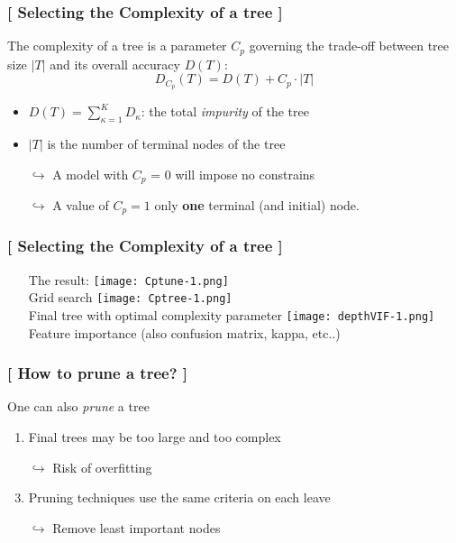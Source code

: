 \documentclass[xcolor=x11names,compress]{beamer}
\renewcommand{\(}{\begin{columns}}
\renewcommand{\)}{\end{columns}}
\newcommand{\<}[1]{\begin{column}{#1}}
\renewcommand{\>}{\end{column}}
\begin{document}
\begin{frame}
\frametitle{\textcolor{brique}{[ Selecting the \textbf{Complexity} of a tree ]}}
The complexity of a tree is a parameter $C_p$ governing the trade-off between tree size $|T|$ and its overall
accuracy $D(T)$:
$$
D_{C_p}(T) = D(T) + C_p \cdot |T|
$$
\begin{itemize}[<+->]
    \item  $D(T) =  \sum_{\kappa=1}^{K} D_{\kappa}$:  the total \emph{impurity} of the tree
    \item $|T|$ is the number of terminal nodes of the tree
    \item[$\hookrightarrow$] A model with $C_p$ = 0 will impose no constrains
    \item[$\hookrightarrow$] A value of $C_p = 1$ only \textbf{one} terminal (and initial) node.
\end{itemize}
\end{frame}


\begin{frame}
\frametitle{\textcolor{brique}{[ Selecting the \textbf{Complexity} of a tree ]}}
\pause
\begin{itemize}
\item[] The result:
    {\texttt{[image: Cptune-1.png]} \\ }
    {Grid search}
    {\texttt{[image: Cptree-1.png]} \\ }
    {Final tree with optimal complexity parameter}
   {\texttt{[image: depthVIF-1.png]} \\ }
   {Feature importance (also confusion matrix, kappa, etc..)}
\end{itemize}
\end{frame}


\begin{frame}
\frametitle{\textcolor{brique}{[ How to \textbf{prune} a tree? ]}}
One can also \textit{prune} a tree
\pause
\begin{enumerate}[<+->]
    \item Final trees may be too large and too complex
    \item[$\hookrightarrow$] Risk of overfitting
    \item Pruning techniques use the same criteria on each leave
    \item[$\hookrightarrow$] Remove least important nodes
\end{enumerate}
\end{frame}
\end{document}
